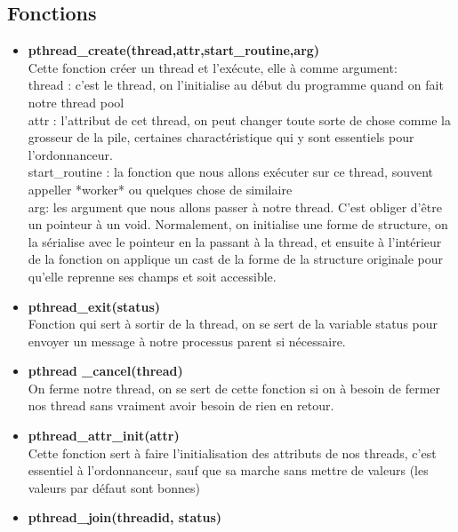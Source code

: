 \documentclass[oneside]{book}
\begin{document}
\subsection{Fonctions}
\begin{itemize}
\item \textbf{pthread\_create(thread,attr,start\_routine,arg)}\\
Cette fonction créer un thread et l'exécute, elle à comme argument:\\

thread : c'est le thread, on l'initialise au début du programme quand on fait notre thread pool \\

attr : l'attribut de cet thread, on peut changer toute sorte de chose comme la grosseur de la pile, certaines charactéristique qui y sont essentiels pour l'ordonnanceur. \\

start\_routine : la fonction que nous allons exécuter sur ce thread, souvent appeller *worker* ou quelques chose de similaire \\

arg: les argument que nous allons passer à notre thread. C'est obliger d'être un pointeur à un void. Normalement, on initialise une forme de structure, on la sérialise avec le pointeur en la passant à la thread, et ensuite à l'intérieur de la fonction on applique un cast de la forme de la structure originale pour qu'elle reprenne ses champs et soit accessible.\\

\item \textbf{pthread\_exit(status)}\\

Fonction qui sert à sortir de la thread, on se sert de la variable status pour envoyer un message à notre processus parent si nécessaire.\\

\item \textbf{pthread \_cancel(thread)}\\

On ferme notre thread, on se sert de cette fonction si on à besoin de fermer nos thread sans vraiment avoir besoin de rien en retour.\\

\item \textbf{pthread\_attr\_init(attr)}\\

Cette fonction sert à faire l'initialisation des attributs de nos threads, c'est essentiel à l'ordonnanceur, sauf que sa marche sans mettre de valeurs (les valeurs par défaut sont bonnes)\\
\item \textbf{pthread\_join(threadid, status)}\\


\end{itemize}
\end{document}
